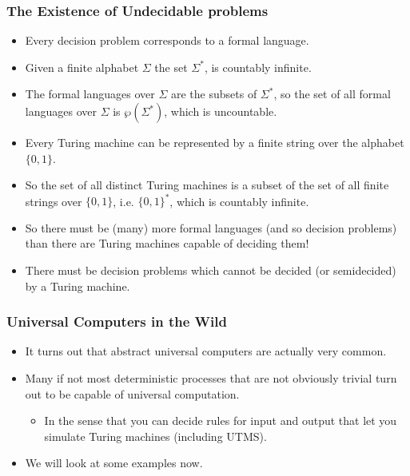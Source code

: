 \documentclass[handout]{beamer}
\begin{document}
\begin{frame}
\frametitle{The Existence of Undecidable problems}
\begin{itemize} 
\item Every decision problem corresponds to a formal language. 
\item Given a finite alphabet $\Sigma$ the set $\Sigma^*$, is countably infinite. 
\item The formal languages over $\Sigma$ are the subsets of $\Sigma^*$, so the set of all formal languages over $\Sigma$ is $\wp(\Sigma^*)$, which is uncountable.\
\item Every Turing machine can be represented by a finite string over the alphabet $\{0,1\}$. 
\item So the set of all distinct Turing machines is a subset of the set of all finite strings over $\{0,1\}$, i.e. $\{0,1\}^*$, which is countably infinite. 
\item So there must be (many) more formal languages (and so decision problems) than there are Turing machines capable of deciding them! 
\item There must be decision problems which cannot be decided (or semidecided) by a Turing machine. 
\end{itemize}
\end{frame}

\begin{frame}
\frametitle{Universal Computers in the Wild}
\begin{itemize} 
\item It turns out that abstract universal computers are actually very common. 
\vspace{0.7cm}
\item Many if not most deterministic processes that are not obviously trivial turn out to be capable of universal computation.
\vspace{0.3cm}
\begin{itemize}
\item In the sense that you can decide rules for input and output that let you simulate Turing machines (including UTMS). 
\end{itemize}
\vspace{0.3cm}
\item We will look at some examples now.
\end{itemize}
\end{frame}
\end{document}
